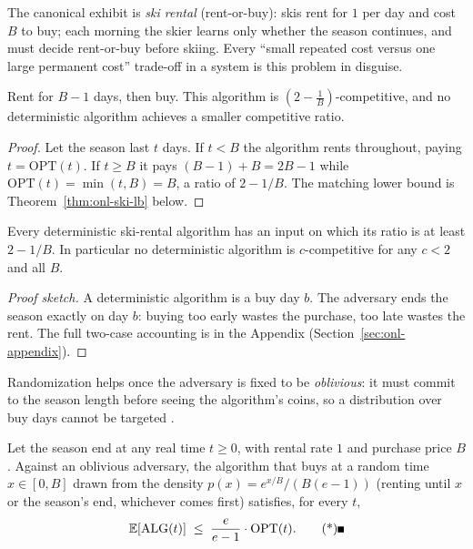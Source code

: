 The canonical exhibit is \emph{ski rental} (rent-or-buy): skis rent for $1$ per day and
cost $B$ to buy; each morning the skier learns only whether the season continues, and
must decide rent-or-buy before skiing. Every ``small repeated cost versus one large
permanent cost'' trade-off in a system is this problem in disguise.

\begin{theorem}\label{thm:onl-ski-det}
Rent for $B-1$ days, then buy. This algorithm is $(2-\tfrac{1}{B})$-competitive, and no
deterministic algorithm achieves a smaller competitive ratio. \eop
\end{theorem}

\begin{proof}
Let the season last $t$ days. If $t < B$ the algorithm rents throughout, paying
$t = \mathrm{OPT}(t)$. If $t \ge B$ it pays $(B-1) + B = 2B - 1$ while
$\mathrm{OPT}(t) = \min(t,B) = B$, a ratio of $2 - 1/B$. The matching lower bound is
Theorem~\ref{thm:onl-ski-lb} below.
\end{proof}

\begin{theorem}\label{thm:onl-ski-lb}
Every deterministic ski-rental algorithm has an input on which its ratio is at least
$2 - 1/B$. In particular no deterministic algorithm is $c$-competitive for any $c < 2$
and all $B$. \eop
\end{theorem}

\begin{proof}[Proof sketch]
A deterministic algorithm is a buy day $b$. The adversary ends the season exactly on
day $b$: buying too early wastes the purchase, too late wastes the rent. The full
two-case accounting is in the Appendix (Section~\ref{sec:onl-appendix}).
\end{proof}

Randomization helps once the adversary is fixed to be \emph{oblivious}: it must commit
to the season length before seeing the algorithm's coins, so a distribution over buy
days cannot be targeted \citep{online-decisions-bg2,online-decisions-bg14}.

\begin{theorem}\label{thm:onl-ski-rand}
Let the season end at any real time $t \ge 0$, with rental rate $1$ and purchase price
$B$. Against an oblivious adversary, the algorithm that buys at a random time
$x \in [0,B]$ drawn from the density $p(x) = e^{x/B}/(B(e-1))$ (renting until $x$ or the
season's end, whichever comes first) satisfies, for every $t$,
\[
\mathbb{E}[\mathrm{ALG}(t)] \;\le\; \frac{e}{e-1}\cdot\mathrm{OPT}(t). \eopm
\]
\end{theorem}

